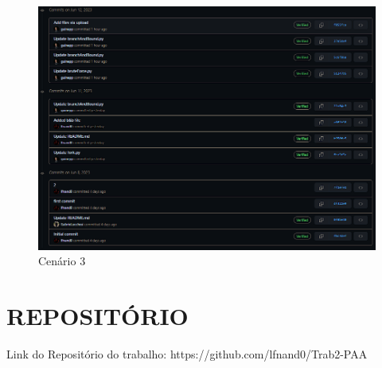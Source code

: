 \begin{figure}[!ht]
	\centering	
	\caption[\hspace{0.1cm}Cenário 3]{Cenário 3}
	  \vspace{-0.4cm}
	\includegraphics[width=.8\textwidth]{figuras/commits.png}
\end{figure}

\section{\esp REPOSITÓRIO}
Link do Repositório do trabalho: https://github.com/lfnand0/Trab2-PAA